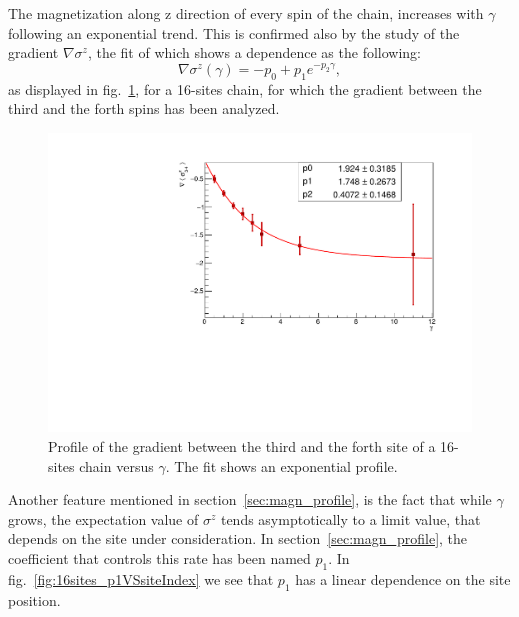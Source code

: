 The magnetization along z direction of every spin of the chain, increases with $\gamma$ following an exponential trend. This is confirmed also by the study of the gradient $\nabla \sigma^z$, the fit of which shows a dependence as the following:
\begin{equation*}
    \nabla \sigma^z (\gamma) = - p_0 + p_1 e^{-p_2\gamma},
\end{equation*}
as displayed in fig.~\ref{fig:FIT_12sites_gradLM34VSgamma}, for a 16-sites chain, for which the gradient between the third and the forth spins has been analyzed.
\begin{figure}[H]
    \centering
    \captionsetup{width=1.\linewidth}
    \includegraphics[scale=0.6]{Figures/16sites_gradLM_3and4VSgamma.pdf}
    \caption{Profile of the gradient between the third and the forth site of a 16-sites chain versus $\gamma$. The fit shows an exponential profile.}
    \label{fig:FIT_12sites_gradLM34VSgamma}
\end{figure}

Another feature mentioned in section~\ref{sec:magn_profile}, is the fact that while $\gamma$ grows, the expectation value of $\sigma^z$ tends asymptotically to a limit value, that depends on the site under consideration. In section~\ref{sec:magn_profile}, the coefficient that controls this rate has been named $p_1$. In fig.~\ref{fig:16sites_p1VSsiteIndex} we see that $p_1$ has a linear dependence on the site position.


